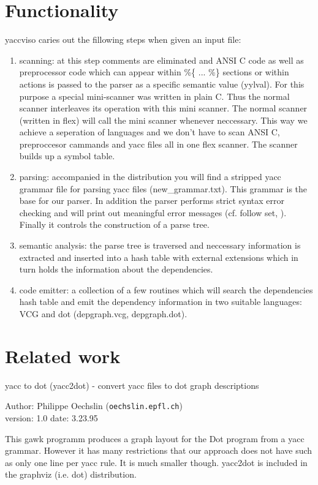 \documentclass[a4paper,twocolumn]{article}
\begin{document}
\section{Functionality}

yaccviso caries out the fillowing steps when given an input file:
\begin{enumerate}
\item	scanning: at this step comments are eliminated and ANSI C code
	as well as preprocessor code which can appear within \%\{ ... \%\}
	sections or within actions is passed to the parser as a specific
	semantic value (yylval). For this purpose a special mini-scanner
	was written in plain C. Thus the normal scanner interleaves its
	operation with this mini scanner. The normal scanner (written in flex)
	will call the mini scanner whenever neccessary. This way we achieve
	a seperation of languages and we don't have to scan ANSI C, 
	preproccesor cammands and yacc files all in one flex scanner.
	The scanner builds up a symbol table.
\item	parsing: accompanied in the distribution you will find a 
	stripped yacc grammar file for parsing yacc files (new\_grammar.txt).
	This grammar is the base for our parser. In addition the parser 
	performs strict syntax error checking and will print out
	meaningful error messages (cf. follow set, \cite{ASU}). Finally
	it controls the construction of a parse tree.
\item	semantic analysis: the parse tree is traversed and neccessary 
	information is extracted and inserted into a hash table with external
	extensions which in turn holds the information about the dependencies.
\item	code emitter: a collection of a few routines which will search
	the dependencies hash table and emit the dependency information
	in two suitable languages: VCG and dot (depgraph.vcg, depgraph.dot).
\end{enumerate}

\section{Related work}
yacc to dot (yacc2dot) - convert yacc files to dot graph descriptions

Author: Philippe Oechslin ({\tt oechslin\@di.epfl.ch})\\
version: 1.0 date: 3.23.95

This gawk programm produces a graph layout for the Dot program from a 
yacc grammar. However it has many restrictions that our approach does not 
have such as only one line per yacc rule. It is much smaller though. 
yacc2dot is included in the graphviz (i.e. dot) distribution.
\end{document}
